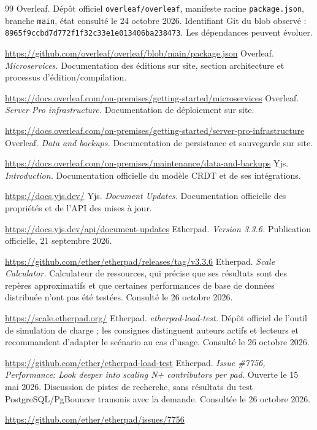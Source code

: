 \begin{thebibliography}{99}
 Overleaf. Dépôt officiel \texttt{overleaf/overleaf}, manifeste racine \texttt{package.json}, branche \texttt{main}, état consulté le 24 octobre 2026. Identifiant Git du blob observé : \texttt{8965f9ccbd7d772f1f32c33e1e013406ba238473}. Les dépendances peuvent évoluer.\par\url{https://github.com/overleaf/overleaf/blob/main/package.json}
 Overleaf. \emph{Microservices.} Documentation des éditions sur site, section architecture et processus d'édition/compilation.\par\url{https://docs.overleaf.com/on-premises/getting-started/microservices}
 Overleaf. \emph{Server Pro infrastructure.} Documentation de déploiement sur site.\par\url{https://docs.overleaf.com/on-premises/getting-started/server-pro-infrastructure}
 Overleaf. \emph{Data and backups.} Documentation de persistance et sauvegarde sur site.\par\url{https://docs.overleaf.com/on-premises/maintenance/data-and-backups}
 Yjs. \emph{Introduction.} Documentation officielle du modèle CRDT et de ses intégrations.\par\url{https://docs.yjs.dev/}
 Yjs. \emph{Document Updates.} Documentation officielle des propriétés et de l'API des mises à jour.\par\url{https://docs.yjs.dev/api/document-updates}
 Etherpad. \emph{Version 3.3.6.} Publication officielle, 21 septembre 2026.\par\url{https://github.com/ether/etherpad/releases/tag/v3.3.6}
 Etherpad. \emph{Scale Calculator.} Calculateur de ressources, qui précise que ses résultats sont des repères approximatifs et que certaines performances de base de données distribuée n'ont pas été testées. Consulté le 26 octobre 2026.\par\url{https://scale.etherpad.org/}
 Etherpad. \emph{etherpad-load-test.} Dépôt officiel de l'outil de simulation de charge ; les consignes distinguent auteurs actifs et lecteurs et recommandent d'adapter le scénario au cas d'usage. Consulté le 26 octobre 2026.\par\url{https://github.com/ether/etherpad-load-test}
 Etherpad. \emph{Issue \#7756, Performance: Look deeper into scaling N+ contributors per pad.} Ouverte le 15 mai 2026. Discussion de pistes de recherche, sans résultats du test PostgreSQL/PgBouncer transmis avec la demande. Consultée le 26 octobre 2026.\par\url{https://github.com/ether/etherpad/issues/7756}

\end{thebibliography}

